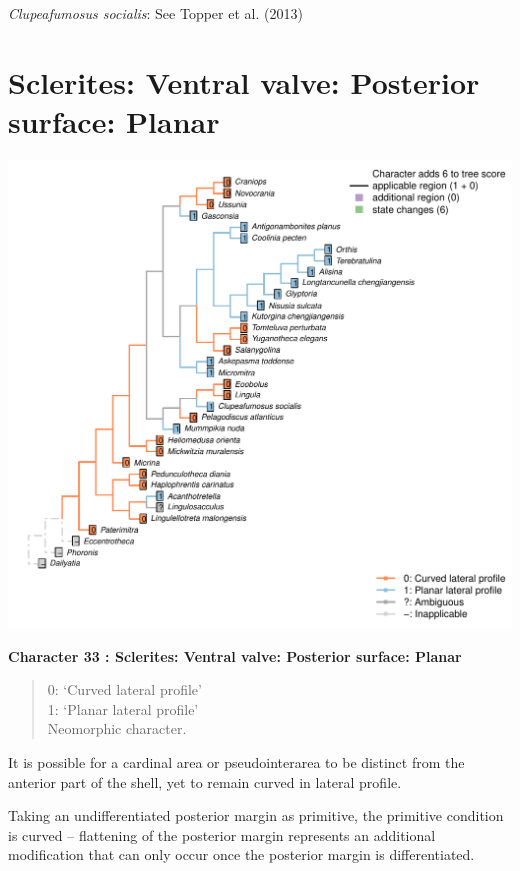 \documentclass[]{book}
\theoremstyle{definition}
\theoremstyle{definition}
\theoremstyle{definition}
\theoremstyle{remark}
\begin{document}
\emph{Clupeafumosus socialis}: See Topper et al. (2013)

\hypertarget{sclerites-ventral-valve-posterior-surface-planar}{%
\section*{Sclerites: Ventral valve: Posterior surface:
Planar}\label{sclerites-ventral-valve-posterior-surface-planar}}

\includegraphics{Brachiopod_phylogeny_files/figure-latex/unnamed-chunk-5-33.pdf}

\textbf{Character 33 : Sclerites: Ventral valve: Posterior surface:
Planar }

\begin{quote}
0: `Curved lateral profile'\\
1: `Planar lateral profile'\\
Neomorphic character.
\end{quote}

It is possible for a cardinal area or pseudointerarea to be distinct
from the anterior part of the shell, yet to remain curved in lateral
profile.

Taking an undifferentiated posterior margin as primitive, the primitive
condition is curved -- flattening of the posterior margin represents an
additional modification that can only occur once the posterior margin is
differentiated.
\end{document}
